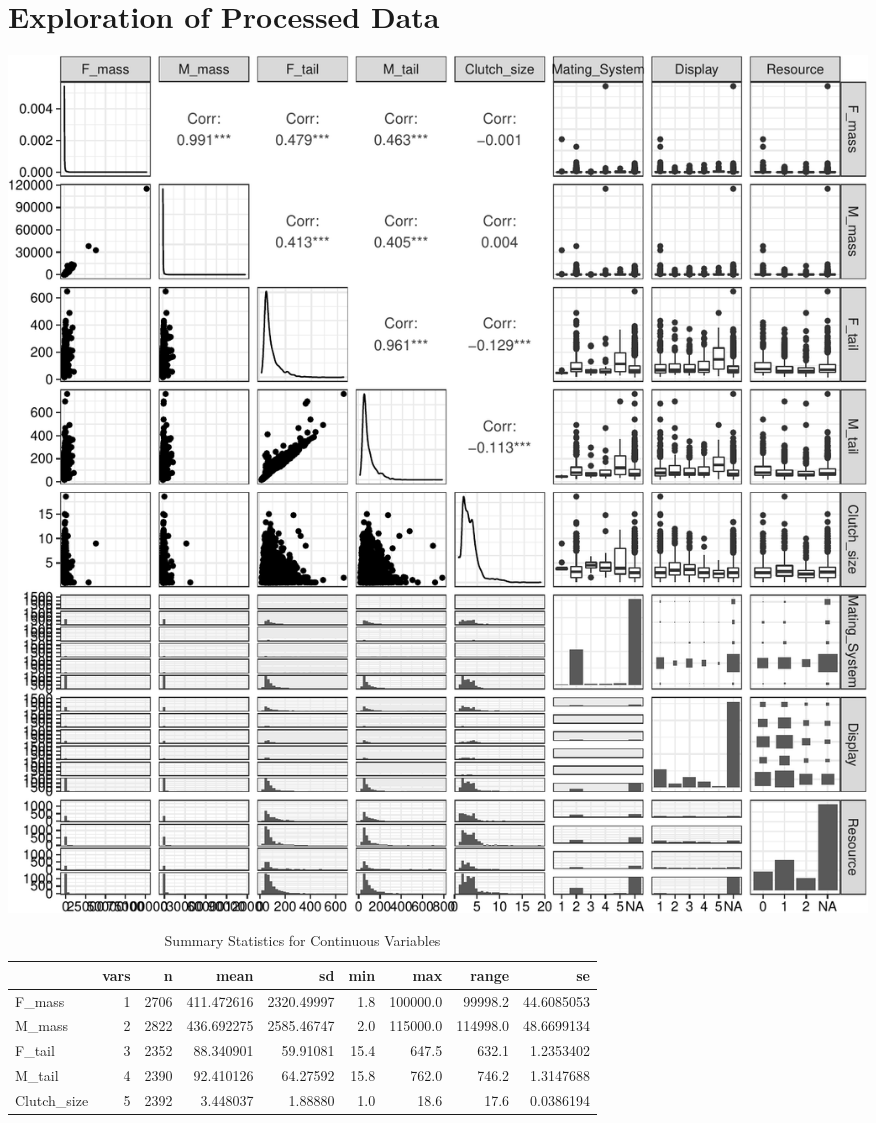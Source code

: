 \documentclass[
  12pt,
]{article}
\begin{document}
\newpage

\hypertarget{exploration-of-processed-data}{%
\section{Exploration of Processed
Data}\label{exploration-of-processed-data}}

\includegraphics{Project_Code_files/figure-latex/gg exploration-1.pdf}

\newpage
\begin{table}

\caption{\label{tab:summary table}Summary Statistics for Continuous Variables}
\centering
\begin{tabular}[t]{l|r|r|r|r|r|r|r|r}
\hline
  & vars & n & mean & sd & min & max & range & se\\
\hline
F\_mass & 1 & 2706 & 411.472616 & 2320.49997 & 1.8 & 100000.0 & 99998.2 & 44.6085053\\
\hline
M\_mass & 2 & 2822 & 436.692275 & 2585.46747 & 2.0 & 115000.0 & 114998.0 & 48.6699134\\
\hline
F\_tail & 3 & 2352 & 88.340901 & 59.91081 & 15.4 & 647.5 & 632.1 & 1.2353402\\
\hline
M\_tail & 4 & 2390 & 92.410126 & 64.27592 & 15.8 & 762.0 & 746.2 & 1.3147688\\
\hline
Clutch\_size & 5 & 2392 & 3.448037 & 1.88880 & 1.0 & 18.6 & 17.6 & 0.0386194\\
\hline
\end{tabular}
\end{table}
\end{document}

